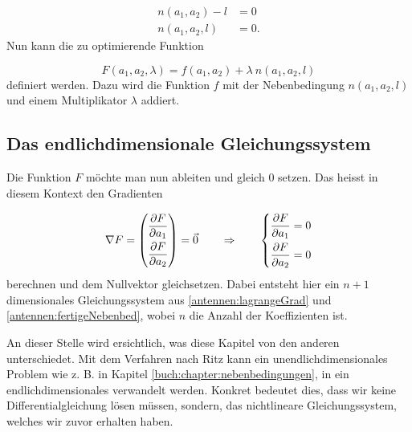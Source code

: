 \begin{equation}
\begin{aligned}
	n(a_1, a_2) - l
	&=
	0
	\\
	n(a_1, a_2, l)
	&=
	0.
\label{antennen:fertigeNebenbed}
\end{aligned}
\end{equation}
Nun kann die zu optimierende Funktion

\begin{equation}
F(a_1,a_2,\lambda)
= 
f(a_1,a_2)+\lambda \: n(a_1,a_2, l)
\end{equation}
definiert werden. Dazu wird die Funktion $f$ mit der Nebenbedingung $n(a_1,a_2,l)$ und einem
Multiplikator $\lambda$ addiert.
%

\subsection{Das endlichdimensionale Gleichungssystem\label{antennen:lagrangeGLsys}}

Die Funktion $F$ möchte man nun ableiten und gleich 0 setzen. Das heisst in diesem Kontext
den Gradienten

\begin{equation}
	\nabla F 
	=
	\begin{pmatrix} 
		\frac{\displaystyle\strut\partial F}{\displaystyle\strut\partial a_1} 
		\\ 
		\frac{\displaystyle\strut\partial F}{\displaystyle\strut\partial a_2}  
	\end{pmatrix} 
	= 
	\vec{0}
	\qquad\Rightarrow\qquad
	\left\{
	\begin{aligned}
		\frac{\partial F}{\partial a_1} = 0 \\
		\frac{\partial F}{\partial a_2} = 0
	\end{aligned}
	\right.
	\label{antennen:lagrangeGrad}
\end{equation}
berechnen und dem Nullvektor gleichsetzen. Dabei entsteht hier ein 
$n+1$ dimensionales Gleichungssystem aus \eqref{antennen:lagrangeGrad} und \eqref{antennen:fertigeNebenbed},
wobei $n$ die Anzahl der Koeffizienten ist.

An dieser Stelle wird ersichtlich, was diese Kapitel von den anderen unterschiedet. Mit dem Verfahren nach Ritz  
kann ein unendlichdimensionales
Problem wie z. B. in Kapitel \ref{buch:chapter:nebenbedingungen}, in ein
endlichdimensionales verwandelt werden. 
Konkret bedeutet dies, dass wir keine Differentialgleichung lösen müssen, sondern, 
das nichtlineare Gleichungssystem, welches wir zuvor erhalten haben.

